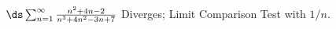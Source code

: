 {$\ds\sum_{n=1}^\infty \frac{n^2+4n-2}{n^3+4n^2-3n+7}$
}
{Diverges; Limit Comparison Test with $1/n$.
}
